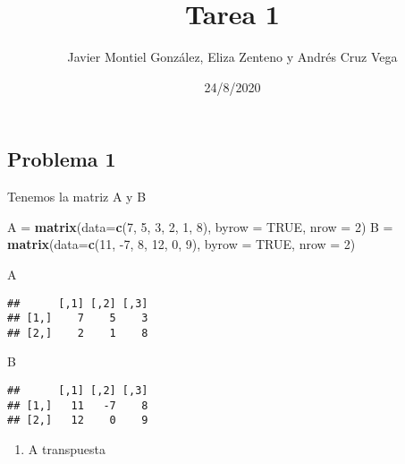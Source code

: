 \documentclass[
]{article}
\title{Tarea 1}
\author{Javier Montiel González, Eliza Zenteno y Andrés Cruz Vega}
\date{24/8/2020}
\newenvironment{Shaded}{\begin{snugshade}}{\end{snugshade}}
\newcommand{\DataTypeTok}[1]{\textcolor[rgb]{0.13,0.29,0.53}{#1}}
\newcommand{\DecValTok}[1]{\textcolor[rgb]{0.00,0.00,0.81}{#1}}
\newcommand{\KeywordTok}[1]{\textcolor[rgb]{0.13,0.29,0.53}{\textbf{#1}}}
\newcommand{\NormalTok}[1]{#1}
\newcommand{\OtherTok}[1]{\textcolor[rgb]{0.56,0.35,0.01}{#1}}
\newcommand{\StringTok}[1]{\textcolor[rgb]{0.31,0.60,0.02}{#1}}
\providecommand{\tightlist}{%
  \setlength{\itemsep}{0pt}\setlength{\parskip}{0pt}}
\begin{document}
\maketitle

\hypertarget{problema-1}{%
\subsection{Problema 1}\label{problema-1}}

Tenemos la matriz A y B

\begin{Shaded}
\begin{Highlighting}[]
\NormalTok{A =}\StringTok{ }\KeywordTok{matrix}\NormalTok{(}\DataTypeTok{data=}\KeywordTok{c}\NormalTok{(}\DecValTok{7}\NormalTok{, }\DecValTok{5}\NormalTok{, }\DecValTok{3}\NormalTok{, }\DecValTok{2}\NormalTok{, }\DecValTok{1}\NormalTok{, }\DecValTok{8}\NormalTok{), }\DataTypeTok{byrow =} \OtherTok{TRUE}\NormalTok{, }\DataTypeTok{nrow =} \DecValTok{2}\NormalTok{)}
\NormalTok{B =}\StringTok{ }\KeywordTok{matrix}\NormalTok{(}\DataTypeTok{data=}\KeywordTok{c}\NormalTok{(}\DecValTok{11}\NormalTok{, }\DecValTok{-7}\NormalTok{, }\DecValTok{8}\NormalTok{, }\DecValTok{12}\NormalTok{, }\DecValTok{0}\NormalTok{, }\DecValTok{9}\NormalTok{), }\DataTypeTok{byrow =} \OtherTok{TRUE}\NormalTok{, }\DataTypeTok{nrow =} \DecValTok{2}\NormalTok{)}
\end{Highlighting}
\end{Shaded}

\begin{Shaded}
\begin{Highlighting}[]
\NormalTok{A}
\end{Highlighting}
\end{Shaded}

\begin{verbatim}
##      [,1] [,2] [,3]
## [1,]    7    5    3
## [2,]    2    1    8
\end{verbatim}

\begin{Shaded}
\begin{Highlighting}[]
\NormalTok{B}
\end{Highlighting}
\end{Shaded}

\begin{verbatim}
##      [,1] [,2] [,3]
## [1,]   11   -7    8
## [2,]   12    0    9
\end{verbatim}

\begin{enumerate}
\def\labelenumi{\alph{enumi})}
\tightlist
\item
  A transpuesta
\end{enumerate}
\end{document}
